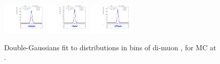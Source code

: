 \begin{figure}[htb]
\includegraphics[width=0.19\textwidth]{plots/Appendix_Recoil_Fits/ZmmMC_PF_5TeV_2G/pfu2fit_32.pdf}
\includegraphics[width=0.19\textwidth]{plots/Appendix_Recoil_Fits/ZmmMC_PF_5TeV_2G/pfu2fit_33.pdf}
\includegraphics[width=0.19\textwidth]{plots/Appendix_Recoil_Fits/ZmmMC_PF_5TeV_2G/pfu2fit_34.pdf}
\caption{Double-Gaussians fit to \uprp distributions in bins of di-muon \pt, for \zmm MC at \serag.}
\label{fig:a:recoil:fit:mc:u2:5}
\end{figure}